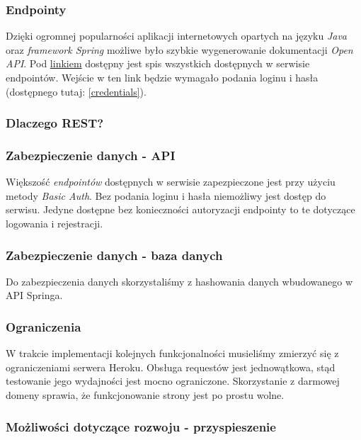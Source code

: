 \subsubsection{Endpointy}
Dzięki ogromnej popularności aplikacji internetowych opartych na języku \textit{Java} oraz \textit{framework Spring} możliwe było szybkie wygenerowanie dokumentacji \textit{Open API}. Pod \href{https://trunk-kartapacjentaservice.herokuapp.com/swagger-ui.html} {linkiem} dostępny jest spis wszystkich dostępnych w serwisie endpointów. Wejście w ten link będzie wymagało podania loginu i hasła (dostępnego tutaj: \ref{credentials}).

\clearpage
\subsubsection{Dlaczego REST?}


\subsubsection{Zabezpieczenie danych - API}
Większość \textit{endpointów} dostępnych w serwisie zapezpieczone jest przy użyciu metody \textit{Basic Auth}. Bez podania loginu i hasła niemożliwy jest dostęp do serwisu. Jedyne dostępne bez konieczności autoryzacji endpointy to te dotyczące logowania i rejestracji.

\subsubsection{Zabezpieczenie danych - baza danych}
Do zabezpieczenia danych skorzystaliśmy z hashowania danych wbudowanego w API Springa.

\subsubsection{Ograniczenia}
W trakcie implementacji kolejnych funkcjonalności musieliśmy zmierzyć się z ograniczeniami serwera Heroku. Obsługa requestów jest jednowątkowa, stąd testowanie jego wydajności jest mocno ograniczone.
Skorzystanie z darmowej domeny sprawia, że funkcjonowanie strony jest po prostu wolne.
\subsubsection{Możliwości dotyczące rozwoju - przyspieszenie}
